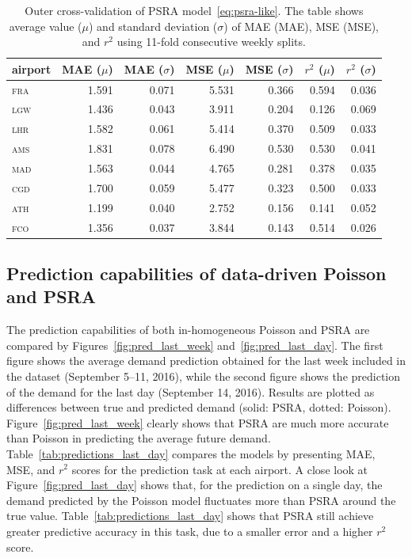 \documentclass[draft,review]{elsarticle}
\newcommand{\airp}[1]{\textcolor{#1}{\textsc{#1}}}
\begin{document}
\begin{table}
  \caption{Outer cross-validation of \acs{PSRA} model~\eqref{eq:psra-like}. The table shows average value (\(\mu\)) and standard deviation (\(\sigma\)) of \acl{MAE} (\acs{MAE}), \acl{MSE} (\acs{MSE}), and \(r^2\) using 11-fold consecutive weekly splits.}
  \label{tab:outer_cv}
  \centering
  \begin{tabular}{lrrrrrr}
    \toprule
    airport &  \acs{MAE} (\(\mu\)) &  \acs{MAE} (\(\sigma\)) &  \acs{MSE} (\(\mu\)) &  \acs{MSE} (\(\sigma\)) &  \(r^2\) (\(\mu\)) &  \(r^2\) (\(\sigma\)) \\
    \midrule
    \airp{fra} & 1.591 & 0.071 & 5.531 & 0.366 & 0.594 & 0.036 \\
    \airp{lgw} & 1.436 & 0.043 & 3.911 & 0.204 & 0.126 & 0.069 \\
    \airp{lhr} & 1.582 & 0.061 & 5.414 & 0.370 & 0.509 & 0.033 \\
    \airp{ams} & 1.831 & 0.078 & 6.490 & 0.530 & 0.530 & 0.041 \\
    \airp{mad} & 1.563 & 0.044 & 4.765 & 0.281 & 0.378 & 0.035 \\
    \airp{cgd} & 1.700 & 0.059 & 5.477 & 0.323 & 0.500 & 0.033 \\
    \airp{ath} & 1.199 & 0.040 & 2.752 & 0.156 & 0.141 & 0.052 \\
    \airp{fco} & 1.356 & 0.037 & 3.844 & 0.143 & 0.514 & 0.026 \\
    \bottomrule
  \end{tabular}
\end{table}

\subsection{Prediction capabilities of data-driven Poisson and \acs{PSRA}}\label{sec:comparison}

The prediction capabilities of both in-homogeneous Poisson and \ac{PSRA} are compared by Figures~\ref{fig:pred_last_week} and~\ref{fig:pred_last_day}.
The first figure shows the average demand prediction obtained for the last week included in the dataset (September 5--11, 2016), while the second figure shows the prediction of the demand for the last day (September 14, 2016).
Results are plotted as differences between true and predicted demand (solid: \ac{PSRA}, dotted: Poisson).
Figure~\ref{fig:pred_last_week} clearly shows that \ac{PSRA} are much more accurate than Poisson in predicting the average future demand.
Table~\ref{tab:predictions_last_day} compares the models by presenting \ac{MAE}, \ac{MSE}, and \(r^2\) scores for the prediction task at each airport.
A close look at Figure~\ref{fig:pred_last_day} shows that, for the prediction on a single day, the demand predicted by the Poisson model fluctuates more than \ac{PSRA} around the true value.
Table~\ref{tab:predictions_last_day} shows that \ac{PSRA} still achieve greater predictive accuracy in this task, due to a smaller error and a higher \(r^2\) score.
\end{document}
